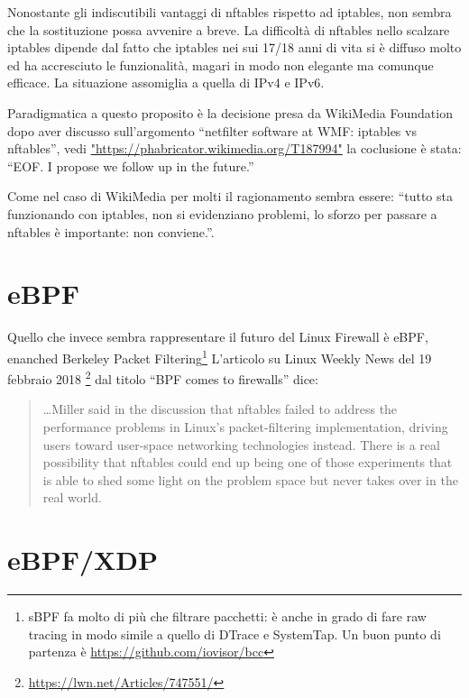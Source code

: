 Nonostante gli indiscutibili vantaggi di nftables rispetto ad iptables, non
sembra che la sostituzione possa avvenire a breve.  La difficolt\`a di nftables
nello scalzare iptables dipende dal fatto che iptables nei sui 17/18 anni di
vita si \`e diffuso molto ed ha accresciuto le funzionalit\`a, magari in modo
non elegante ma comunque efficace. La situazione assomiglia a quella di IPv4 e
IPv6.

Paradigmatica a questo proposito \`e la decisione presa da WikiMedia Foundation
dopo aver discusso sull'argomento ``netfilter software at WMF: iptables vs
nftables'', vedi  \url{"https://phabricator.wikimedia.org/T187994"}
la coclusione \`e stata: ``EOF. I propose we follow up in the future.''

Come nel caso di WikiMedia per molti il ragionamento sembra essere: ``tutto sta
funzionando con iptables, non si evidenziano problemi, lo sforzo per passare a
nftables \`e importante: non conviene.''.

\section{eBPF}

Quello che invece sembra rappresentare il futuro del Linux Firewall \`e eBPF,
enanched Berkeley Packet Filtering\footnote{sBPF fa molto di pi\`u che filtrare
pacchetti: \`e anche in grado di fare raw tracing in modo simile a quello di
DTrace e SystemTap. Un buon punto di partenza \`e \url{https://github.com/iovisor/bcc}}
L'articolo su Linux Weekly News del 19 febbraio 2018
\footnote{\url{https://lwn.net/Articles/747551/}} dal titolo ``BPF comes to firewalls''
dice:

\begin{quote}
\ldots Miller said in the discussion that nftables failed to address the
performance problems in Linux's packet-filtering implementation, driving users
toward user-space networking technologies instead. There is a real possibility
that nftables could end up being one of those experiments that is able to shed
some light on the problem space but never takes over in the real world.
\end{quote}


\section{eBPF/XDP}

